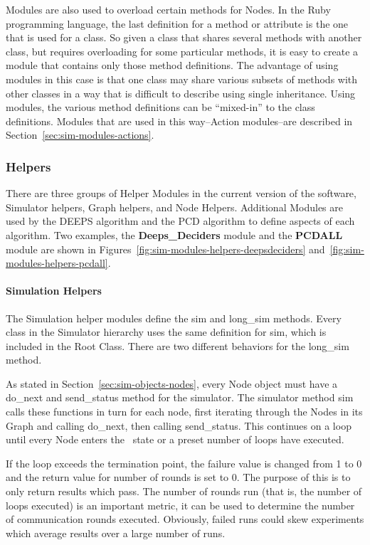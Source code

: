 \documentclass[technote, 10pt, letter]{IEEEtran}
\begin{document}
Modules are also used to overload certain methods for Nodes. In the Ruby programming language, the last definition for a method or attribute is the one that is used for a class. So given a class that shares several methods with another class, but requires overloading for some particular methods, it is easy to create a module that contains only those method definitions. The advantage of using modules in this case is that one class may share various subsets of methods with other classes in a way that is difficult to describe using single inheritance. Using modules, the various method definitions can be ``mixed-in'' to the class definitions. Modules that are used in this way--Action modules--are described in Section~\ref{sec:sim-modules-actions}.

\subsubsection{Helpers}
\label{sec:sim-modules-helpers}
There are three groups of Helper Modules in the current version of the software, Simulator helpers, Graph helpers, and Node Helpers. Additional Modules are used by the DEEPS algorithm and the PCD algorithm to define aspects of each algorithm. Two examples, the {\bfseries Deeps\_Deciders} module and the {\bfseries PCDALL} module are shown in Figures~\ref{fig:sim-modules-helpers-deepsdeciders} and~\ref{fig:sim-modules-helpers-pcdall}. 


\paragraph{Simulation Helpers}
\label{sec:sim-helpers-simulation}

The Simulation helper modules define the {\ttfamily sim} and {\ttfamily long\_sim} methods. Every class in the Simulator hierarchy uses the same definition for {\ttfamily sim}, which is included in the Root Class. There are two different behaviors for the {\ttfamily long\_sim} method. 

As stated in Section~\ref{sec:sim-objects-nodes}, every Node object must have a {\ttfamily do\_next} and {\ttfamily send\_status} method for the simulator. The simulator method {\ttfamily sim} calls these functions in turn for each node, first iterating through the Nodes in its Graph and calling {\ttfamily do\_next}, then calling {\ttfamily send\_status}. This continues on a loop until every Node enters the \cDd\ state or a preset number of loops have executed. 

If the loop exceeds the termination point, the failure value is changed from 1 to 0 and the return value for number of rounds is set to 0. The purpose of this is to only return results which pass. The number of rounds run (that is, the number of loops executed) is an important metric, it can be used to determine the number of communication rounds executed. Obviously, failed runs could skew experiments which average results over a large number of runs.
\end{document}
